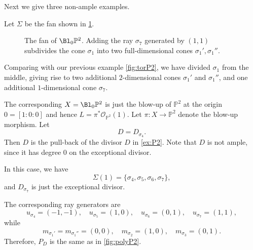 Next we give three non-ample examples.
\begin{example}\label{ex:P2bl1pt}
    Let $\Sigma$ be the fan shown in \cref{fig:polyP2b1p}.
    \begin{figure}[ht]
        \centering
        \caption{The fan of $\Bl_0\mathbb{P}^2$. Adding the ray $\sigma_7$ generated by $(1,1)$ subdivides the cone $\sigma_1$ into two full-dimensional cones $\sigma_1',\sigma_1''$.}
        \label{fig:polyP2b1p}
    \end{figure}
    Comparing with our previous example \cref{fig:torP2}, we have divided $\sigma_1$ from the middle, giving rise to two additional $2$-dimensional cones $\sigma_1'$ and $\sigma_1''$, and one additional $1$-dimensional cone $\sigma_7$.

    The corresponding $X=\Bl_0 \mathbb{P}^2$ is just the blow-up of $\mathbb{P}^2$ at the origin $0=[1:0:0]$ and hence $L=\pi^*\mathcal{O}_{\mathbb{P}^2}(1)$. Let $\pi\colon X\rightarrow \mathbb{P}^2$ denote the blow-up morphism.
    Let
    \[
    D=D_{\sigma_4}.
    \]
    Then $D$ is the pull-back of the divisor $D$ in \cref{ex:P2}. Note that $D$ is not ample, since it has degree $0$ on the exceptional divisor.

    In this case, we have
    \[
    \Sigma(1)=\{\sigma_4,\sigma_5,\sigma_6,\sigma_7\},
    \]
    and $D_{\sigma_7}$ is just the exceptional divisor.

    The corresponding ray generators are
    \[
    u_{\sigma_4}=(-1,-1),\quad u_{\sigma_5}=(1,0),\quad u_{\sigma_6}=(0,1),\quad u_{\sigma_7}=(1,1),
    \]
    while
    \[
    m_{\sigma_1'}=m_{\sigma_1''}=(0,0),\quad m_{\sigma_2}=(1,0),\quad m_{\sigma_3}=(0,1).
    \]
    Therefore, $P_D$ is the same as in \cref{fig:polyP2}.


\end{example}
